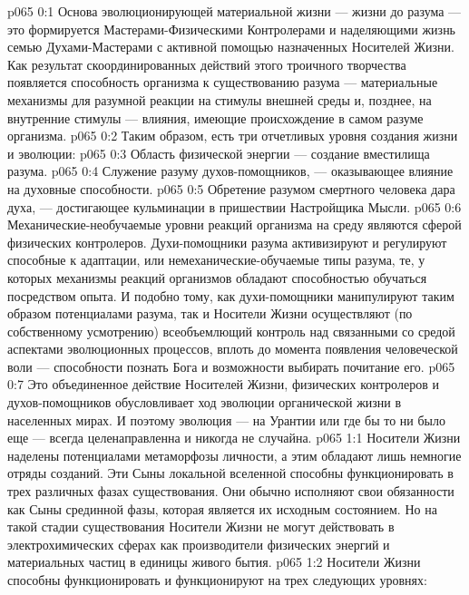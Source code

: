 \author{Носитель Жизни}
\vs p065 0:1 Основа эволюционирующей материальной жизни --- жизни до разума --- это формируется Мастерами\hyp{}Физическими Контролерами и наделяющими жизнь семью Духами\hyp{}Мастерами с активной помощью назначенных Носителей Жизни. Как результат скоординированных действий этого троичного творчества появляется способность организма к существованию разума --- материальные механизмы для разумной реакции на стимулы внешней среды и, позднее, на внутренние стимулы --- влияния, имеющие происхождение в самом разуме организма.
\vs p065 0:2 \pc Таким образом, есть три отчетливых уровня создания жизни и эволюции:
\vs p065 0:3 \bibnobreakspace Область физической энергии --- создание вместилища разума.
\vs p065 0:4 \bibnobreakspace Служение разуму духов\hyp{}помощников, --- оказывающее влияние на духовные способности.
\vs p065 0:5 \bibnobreakspace Обретение разумом смертного человека дара духа, --- достигающее кульминации в пришествии Настройщика Мысли.
\vs p065 0:6 \pc Механические\hyp{}необучаемые уровни реакций организма на среду являются сферой физических контролеров. Духи\hyp{}помощники разума активизируют и регулируют способные к адаптации, или немеханические\hyp{}обучаемые типы разума, те, у которых механизмы реакций организмов обладают способностью обучаться посредством опыта. И подобно тому, как духи\hyp{}помощники манипулируют таким образом потенциалами разума, так и Носители Жизни осуществляют (по собственному усмотрению) всеобъемлющий контроль над связанными со средой аспектами эволюционных процессов, вплоть до момента появления человеческой воли --- способности познать Бога и возможности выбирать почитание его.
\vs p065 0:7 Это объединенное действие Носителей Жизни, физических контролеров и духов\hyp{}помощников обусловливает ход эволюции органической жизни в населенных мирах. И поэтому эволюция --- на Урантии или где бы то ни было еще --- всегда целенаправленна и никогда не случайна.
\vs p065 1:1 Носители Жизни наделены потенциалами метаморфозы личности, а этим обладают лишь немногие отряды созданий. Эти Сыны локальной вселенной способны функционировать в трех различных фазах существования. Они обычно исполняют свои обязанности как Сыны срединной фазы, которая является их исходным состоянием. Но на такой стадии существования Носители Жизни не могут действовать в электрохимических сферах как производители физических энергий и материальных частиц в единицы живого бытия.
\vs p065 1:2 Носители Жизни способны функционировать и функционируют на трех следующих уровнях:
